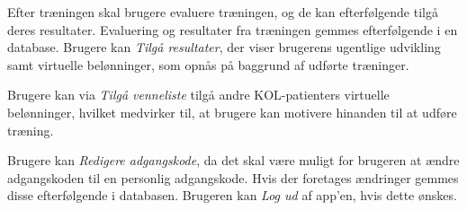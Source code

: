 Efter træningen skal brugere evaluere træningen, og de kan efterfølgende tilgå deres  resultater. Evaluering og resultater fra træningen gemmes efterfølgende i en database. Brugere kan \textit{Tilgå resultater}, der viser brugerens ugentlige udvikling samt virtuelle belønninger, som opnås på baggrund af udførte træninger. 



Brugere kan via \textit{Tilgå venneliste} tilgå andre KOL-patienters virtuelle belønninger, hvilket medvirker til, at brugere kan motivere hinanden til at udføre træning. 

Brugere kan \textit{Redigere adgangskode}, da det skal være muligt for brugeren at ændre adgangskoden til en personlig adgangskode. Hvis der foretages ændringer gemmes disse efterfølgende i databasen.
Brugeren kan \textit{Log ud} af app'en, hvis dette ønskes. 

%
%
%
%
